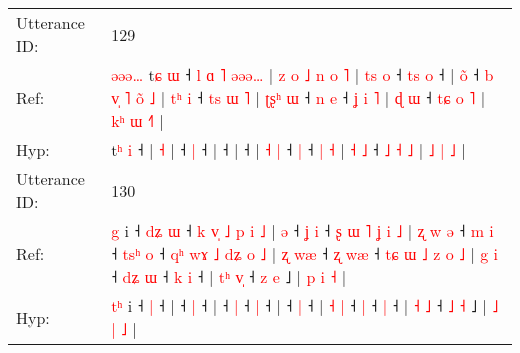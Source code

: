 \documentclass[10pt]{article}
\DeclareRobustCommand{\hl}[1]{{\textcolor{red}{#1}}}
\begin{document}
\begin{longtable}{ll}
 \\
\midrule
Utterance ID: & 129 \\
Ref: & \hl{ə}\hl{ə}\hl{ə}\hl{…}\hl{ }t\hl{ɕ} \hl{ɯ} ˧\hl{ }\hl{l}\hl{ }\hl{ɑ}\hl{ }\hl{˥}\hl{ }\hl{ə}\hl{ə}\hl{ə}\hl{…} |\hl{ }\hl{z}\hl{ }\hl{o}\hl{ }\hl{˩}\hl{ }\hl{n}\hl{ }\hl{o} \hl{˥} |\hl{ }\hl{t}\hl{s}\hl{ }\hl{o} ˧\hl{ }\hl{t}\hl{s} \hl{o} ˧ |\hl{ }\hl{o}\hl{̃} ˧\hl{ }\hl{b}\hl{ }\hl{v}\hl{̩}\hl{ }\hl{˥}\hl{ }\hl{o}\hl{̃}\hl{ }\hl{˩} |\hl{ }\hl{t}\hl{ʰ}\hl{ }\hl{i} ˧\hl{ }\hl{t}\hl{s}\hl{ }\hl{ɯ}\hl{ }\hl{˥} | \hl{ʈ}\hl{ʂ}\hl{ʰ} \hl{ɯ} ˧\hl{ }\hl{n} \hl{e} ˧\hl{ }\hl{ʝ} \hl{i} \hl{˥} | \hl{ɖ} \hl{ɯ} ˧ \hl{t}\hl{ɕ} \hl{o} \hl{˥} | \hl{k}\hl{ʰ} \hl{ɯ} \hl{˧}\hl{˥} |
 \\
Hyp: & \hl{}\hl{}\hl{}\hl{}\hl{}t\hl{ʰ} \hl{i} ˧\hl{}\hl{}\hl{}\hl{}\hl{}\hl{}\hl{}\hl{}\hl{}\hl{}\hl{} |\hl{}\hl{}\hl{}\hl{}\hl{}\hl{}\hl{}\hl{}\hl{}\hl{} \hl{˧} |\hl{}\hl{}\hl{}\hl{}\hl{} ˧\hl{}\hl{}\hl{} \hl{|} ˧ |\hl{}\hl{}\hl{} ˧\hl{}\hl{}\hl{}\hl{}\hl{}\hl{}\hl{}\hl{}\hl{}\hl{}\hl{}\hl{} |\hl{}\hl{}\hl{}\hl{}\hl{} ˧\hl{}\hl{}\hl{}\hl{}\hl{}\hl{}\hl{} | \hl{}\hl{}\hl{˧} \hl{|} ˧\hl{}\hl{} \hl{|} ˧\hl{}\hl{} \hl{|} \hl{˧} | \hl{˧} \hl{˩} ˧ \hl{}\hl{˩} \hl{˧} \hl{˩} | \hl{}\hl{˩} \hl{|} \hl{}\hl{˩} |
 \\
\midrule
Utterance ID: & 130 \\
Ref: & \hl{}\hl{g} i ˧\hl{ }\hl{d}\hl{ʑ} \hl{ɯ} ˧\hl{ }\hl{k}\hl{ }\hl{v}\hl{̩}\hl{ }\hl{˩}\hl{ }\hl{p}\hl{ }\hl{i}\hl{ }\hl{˩} |\hl{ }\hl{ə} ˧\hl{ }\hl{ʝ} \hl{i} ˧\hl{ }\hl{ʂ}\hl{ }\hl{ɯ}\hl{ }\hl{˥}\hl{ }\hl{ʝ}\hl{ }\hl{i}\hl{ }\hl{˩} |\hl{ }\hl{ʐ}\hl{ }\hl{w}\hl{ }\hl{ə} ˧\hl{ }\hl{m} \hl{i} ˧\hl{ }\hl{t}\hl{s}\hl{ʰ} \hl{o} ˧\hl{ }\hl{q}\hl{ʰ}\hl{ }\hl{w}\hl{ɤ}\hl{ }\hl{˩}\hl{ }\hl{d}\hl{ʑ}\hl{ }\hl{o}\hl{ }\hl{˩} |\hl{ }\hl{ʐ}\hl{ }\hl{w}\hl{æ} ˧\hl{ }\hl{ʐ} \hl{w}\hl{æ} ˧\hl{ }\hl{t}\hl{ɕ}\hl{ }\hl{ɯ}\hl{ }\hl{˩}\hl{ }\hl{z}\hl{ }\hl{o}\hl{ }\hl{˩} | \hl{g} \hl{i} ˧\hl{ }\hl{d}\hl{ʑ} \hl{ɯ} ˧\hl{ }\hl{k} \hl{i} ˧ | \hl{t}\hl{ʰ} \hl{v}\hl{̩} ˧ \hl{z} \hl{e} ˩ | \hl{p} \hl{i} \hl{˧} |
 \\
Hyp: & \hl{t}\hl{ʰ} i ˧\hl{}\hl{}\hl{} \hl{|} ˧\hl{}\hl{}\hl{}\hl{}\hl{}\hl{}\hl{}\hl{}\hl{}\hl{}\hl{}\hl{}\hl{} |\hl{}\hl{} ˧\hl{}\hl{} \hl{|} ˧\hl{}\hl{}\hl{}\hl{}\hl{}\hl{}\hl{}\hl{}\hl{}\hl{}\hl{}\hl{} |\hl{}\hl{}\hl{}\hl{}\hl{}\hl{} ˧\hl{}\hl{} \hl{|} ˧\hl{}\hl{}\hl{}\hl{} \hl{|} ˧\hl{}\hl{}\hl{}\hl{}\hl{}\hl{}\hl{}\hl{}\hl{}\hl{}\hl{}\hl{}\hl{}\hl{}\hl{} |\hl{}\hl{}\hl{}\hl{}\hl{} ˧\hl{}\hl{} \hl{}\hl{|} ˧\hl{}\hl{}\hl{}\hl{}\hl{}\hl{}\hl{}\hl{}\hl{}\hl{}\hl{}\hl{}\hl{} | \hl{˧} \hl{|} ˧\hl{}\hl{}\hl{} \hl{|} ˧\hl{}\hl{} \hl{|} ˧ | \hl{}\hl{˧} \hl{}\hl{˩} ˧ \hl{˩} \hl{˧} ˩ | \hl{˩} \hl{|} \hl{˩} |

\end{longtable}
\end{document}
